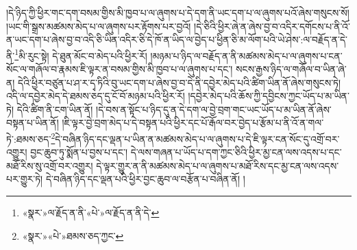 །དེ་ཉིད་ཀྱི་ཕྱིར་གང་དག་བསམ་གྱིས་མི་ཁྱབ་པ་ལ་ཞུགས་པ་དེ་དག་ནི་ཡང་དག་པ་ལ་ཞུགས་པའོ་ཞེས་གསུངས་སོ། །ཡང་གི་སྒྲས་མཚམས་མེད་པ་ལ་ཞུགས་པར་རྟོགས་པར་བྱའོ། །དེ་ཅིའི་ཕྱིར་ཞེ་ན་ཞེས་བྱ་བ་འདིར་དགོངས་པ་ནི་འོ་ན་ཡང་དག་པ་ཞེས་བྱ་བ་འདི་ཅི་ཡིན་འདིར་ཅི་དེ་ཁོ་ན་ཡིད་ལ་བྱེད་པ་ཕྱིན་ཅི་མ་ལོག་པའི་ཡེ་ཤེས་:ལ་བརྗོད་ན་དེ་ནི་\footnote{«སྣར་»ལ་རྗོད་ན་ནི་«པེ་»ལ་རྗོད་ན་ནི་དེ་}མི་རུང་སྟེ། དེ་ཐུན་མོང་བ་མེད་པའི་ཕྱིར་རོ། །མཉམ་པ་ཉིད་ལ་བརྗོད་ན་ནི་མཚམས་མེད་པ་ལ་ཞུགས་པ་ངན་སོང་ལ་གཞོལ་བ་རྣམས་ཇི་ལྟར་ན་བསམ་གྱིས་མི་ཁྱབ་པ་ལ་ཞུགས་པ་དང་། སངས་རྒྱས་ཉིད་ལ་གཞོལ་བ་ཡིན་ཞེ་ན། དེའི་ཕྱིར་བཙུན་པ་ཤ་ར་དྭ་ཏིའི་བུ་ཡང་དག་པ་ཞེས་བྱ་བ་དེ་ནི་དབྱེར་མེད་པའི་ཚིག་ཡིན་ནོ་ཞེས་གསུངས་ཏེ། འདི་ལ་དབྱེར་མེད་དེ་ཐམས་ཅད་དུ་ངོ་བོ་མཉམ་པའི་ཕྱིར་རོ། །དབྱེར་མེད་པའི་ཆོས་ཀྱི་དབྱིངས་ཀྱང་ཡོད་པ་མ་ཡིན་ཏེ། དེའི་ཚིག་ནི་ངག་ཡིན་ནོ། །དེ་བས་ན་སྟོང་པ་ཉིད་དུ་ན་དེ་དག་ལ་བྱེ་བྲག་གང་ཡང་ཡོད་པ་མ་ཡིན་ནོ་ཞེས་བསྟན་པ་ཡིན་ནོ། །ཇི་ལྟར་བྱེ་བྲག་མེད་པ་དེ་བསྟན་པའི་ཕྱིར་དང་པོ་རྒོལ་བར་བྱེད་པ་རྩོམ་པ་ནི་འོ་ན་གལ་ཏེ་:ཐམས་ཅད་\footnote{«སྣར་»«པེ་»ཐམས་ཅད་ཀྱང་}དེ་བཞིན་ཉིད་དང་ལྡན་པ་ཡིན་ན་མཚམས་མེད་པ་ལ་ཞུགས་པ་དེ་ཇི་ལྟར་ངན་སོང་དུ་འགྲོ་བར་འགྱུར། བྱང་ཆུབ་ཏུ་སྨོན་པ་བྱས་པ་དང་། དེ་ལས་གཞན་པ་ཡོད་པ་དག་ཀྱང་ཅིའི་ཕྱིར་མྱ་ངན་ལས་འདས་པ་དང་མཐོ་རིས་སུ་འགྲོ་བར་འགྱུར། དེ་ལྟར་གྱུར་ན་ནི་མཚམས་མེད་པ་ལ་ཞུགས་པ་མཐོ་རིས་དང་མྱ་ངན་ལས་འདས་པར་གྱུར་ཏེ། དེ་བཞིན་ཉིད་དང་ལྡན་པའི་ཕྱིར་བྱང་ཆུབ་ལ་བརྩོན་པ་བཞིན་ནོ། །
